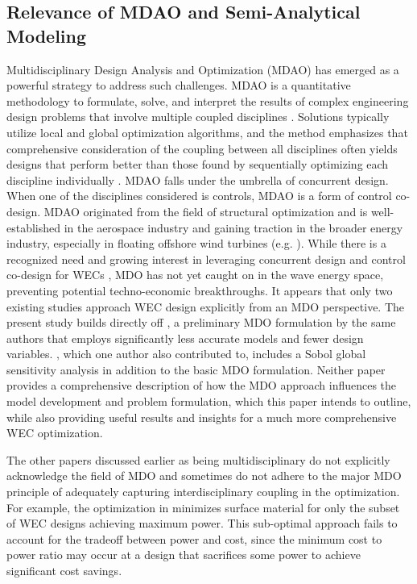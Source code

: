 \subsection{Relevance of MDAO and Semi-Analytical Modeling}
Multidisciplinary Design Analysis and Optimization (MDAO) has emerged as a powerful strategy to address such challenges.
MDAO is a quantitative methodology to formulate, solve, and interpret the results of complex engineering design problems that involve multiple coupled disciplines \cite{agteMDOAssessmentDirection2009}.
Solutions typically utilize local and global optimization algorithms, and the method emphasizes that comprehensive consideration of the coupling between all disciplines often yields designs that perform better than those found by sequentially optimizing each discipline individually \cite{martinsMultidisciplinaryDesignOptimization2013}.
MDAO falls under the umbrella of concurrent design.
When one of the disciplines considered is controls, MDAO is a form of control co-design.
MDAO originated from the field of structural optimization and is well-established in the aerospace industry and gaining traction in the broader energy industry, especially in floating offshore wind turbines (e.g. \cite{abbas_control_2024,jasa_effectively_2022,patryniak_multidisciplinary_2022}).
While there is a recognized need and growing interest in leveraging concurrent design and control co-design for WECs \cite{mi_multi-scale_2025,ringwood_empowering_2023}, MDO has not yet caught on in the wave energy space, preventing potential techno-economic breakthroughs.
It appears that only two existing studies \cite{mccabe_multidisciplinary_2022,khanal_multi-objective_2024} approach WEC design explicitly from an MDO perspective.
The present study builds directly off \cite{mccabe_multidisciplinary_2022}, a preliminary MDO formulation by the same authors that employs significantly less accurate models and fewer design variables.
\cite{khanal_multi-objective_2024}, which one author also contributed to, includes a Sobol global sensitivity analysis in addition to the basic MDO formulation.
Neither paper provides a comprehensive description of how the MDO approach influences the model development and problem formulation, which this paper intends to outline, while also providing useful results and insights for a much more comprehensive WEC optimization. 

The other papers discussed earlier as being multidisciplinary do not explicitly acknowledge the field of MDO and sometimes do not adhere to the major MDO principle of adequately capturing interdisciplinary coupling in the optimization.
For example, the optimization in \cite{edwards_optimisation_2022} minimizes surface material for only the subset of WEC designs achieving maximum power.
This sub-optimal approach fails to account for the tradeoff between power and cost, since the minimum cost to power ratio may occur at a design that sacrifices some power to achieve significant cost savings.

